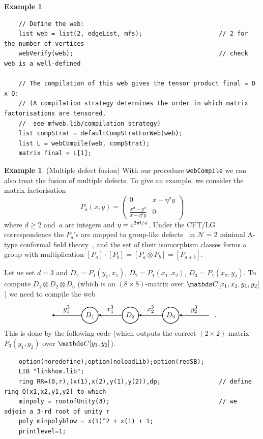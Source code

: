 \documentclass{compositio}
\theoremstyle{definition}
\newtheorem{example}[theorem]{Example}
\numberwithin{equation}{section}
\begin{document}
\begin{example}
{\begin{verbatim}
    // Define the web:
    list web = list(2, edgeList, mfs);                     // 2 for the number of vertices
    webVerify(web);                                        // check web is a well-defined
    
    // The compilation of this web gives the tensor product final = D x Q:
    // (A compilation strategy determines the order in which matrix factorisations are tensored, 
    //  see mfweb.lib/compilation strategy)
    list compStrat = defaultCompStratForWeb(web);
    list L = webCompile(web, compStrat);
    matrix final = L[1];
\end{verbatim}
}
\end{example}


\begin{example}(Multiple defect fusion)
With our procedure \texttt{webCompile} we can also treat the fusion of multiple defects. To give an example, we consider the matrix factorisation
$$
P_{a}(x,y)=\begin{pmatrix} 0 & x-\eta^{a} y \\ \frac{x^d-y^d}{x-\eta^{a} y} & 0\end{pmatrix}
$$
where $d\geqslant 2$ and~$a$ are integers and $\eta=\operatorname{e}\!^{2\pi\!\operatorname{i}\!/a}$. Under the CFT/LG correspondence the $P_{a}$'s are mapped to group-like defects~\cite{ffrs0607247} in $\mathcal N=2$ minimal A-type conformal field theory~\cite{br0707.0922, cr0909.4381}, and the set of their isomorphism classes forms a group with multiplication $[P_{a}]\cdot[P_{b}] = [P_{a}\otimes P_{b}] = [P_{a+b}]$. 

Let us set $d=3$ and $D_{1}=P_{1}(y_{1},x_{1})$, $D_{2}=P_{1}(x_{1},x_{2})$, $D_{3}=P_{1}(x_{2},y_{2})$. To compute $D_{1}\otimes D_{2}\otimes D_{3}$ (which is an $(8\times 8)$-matrix over $\nC[x_{1},x_{2},y_{1},y_{2}]$) we need to compile the web
$$
\begin{tikzpicture}[scale=1.0,baseline=-0.1cm, inner sep=1mm, >=stealth]
\node (b) at (-2,0)  {};
\node (D1) at (0,0) [circle,draw=black,fill= white, thick] {$D_{1}$};
\node (D2) at (2,0) [circle,draw=black,fill= white, thick] {$D_{2}$};
\node (D3) at (4,0) [circle,draw=black,fill= white, thick] {$D_{3}$};
\node (b2) at (6,0)  {};
\draw[->,  thick] (D1) -- (b) node[midway,above] {$y_{1}^3$}; 
\draw[->,  thick] (D2) -- (D1) node[midway,above] {$x_{1}^3$}; 
\draw[->,  thick] (D3) -- (D2) node[midway,above] {$x_{2}^3$}; 
\draw[->,  thick] (b2) -- (D3) node[midway,above] {$y_{2}^3$}; 
\end{tikzpicture} \, .
$$
This is done by the following code (which outputs the correct $(2\times 2)$-matrix $P_{3}(y_{1},y_{2})$ over $\nC[y_{1},y_{2}]$). 
{\footnotesize
\begin{verbatim}
    option(noredefine);option(noloadLib);option(redSB);
    LIB "linkhom.lib";
    ring RR=(0,r),(x(1),x(2),y(1),y(2)),dp;                // define ring Q[x1,x2,y1,y2] to which
    minpoly = rootofUnity(3);                              // we adjoin a 3-rd root of unity r
    poly minpolyblow = x(1)^2 + x(1) + 1;
    printlevel=1;
    

\end{verbatim}}
\end{example}
\end{document}
